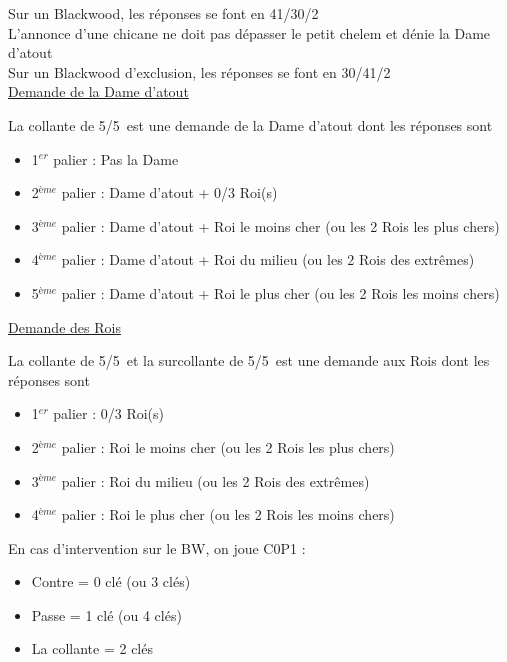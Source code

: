 \documentclass[a4paper, oneside, 11pt]{report}
\begin{document}
		Sur un Blackwood, les réponses se font en 41/30/2\\
		L'annonce d'une chicane ne doit pas dépasser le petit chelem et dénie la Dame d'atout\\
		Sur un Blackwood d'exclusion, les réponses se font en 30/41/2\\

		\underline{Demande de la Dame d'atout}

		La collante de 5\trefle/5\carreau\ est une demande de la Dame d'atout dont les réponses sont
		\begin{itemize}
		\item 1$^{er}$ palier : Pas la Dame
		\item 2$^{ème}$ palier : Dame d'atout + 0/3 Roi(s)
		\item 3$^{ème}$ palier : Dame d'atout + Roi le moins cher (ou les 2 Rois les plus chers)
		\item 4$^{ème}$ palier : Dame d'atout + Roi du milieu (ou les 2 Rois des extrêmes)
		\item 5$^{ème}$ palier : Dame d'atout + Roi le plus cher (ou les 2 Rois les moins chers)\\
		\end{itemize}		

		\underline{Demande des Rois}
		
		La collante de 5\coeur/5\pique\ et la surcollante de 5\trefle/5\carreau\ est une demande aux Rois dont les réponses sont 
		\begin{itemize}
		\item 1$^{er}$ palier : 0/3 Roi(s)
		\item 2$^{ème}$ palier : Roi le moins cher (ou les 2 Rois les plus chers)
		\item 3$^{ème}$ palier : Roi du milieu (ou les 2 Rois des extrêmes)
		\item 4$^{ème}$ palier : Roi le plus cher (ou les 2 Rois les moins chers)\\
		\end{itemize}

		En cas d'intervention sur le BW, on joue C0P1 :
		\begin{itemize}
		\item Contre = 0 clé (ou 3 clés)
		\item Passe = 1 clé (ou 4 clés)
		\item La collante = 2 clés\\
		\end{itemize}
\end{document}

